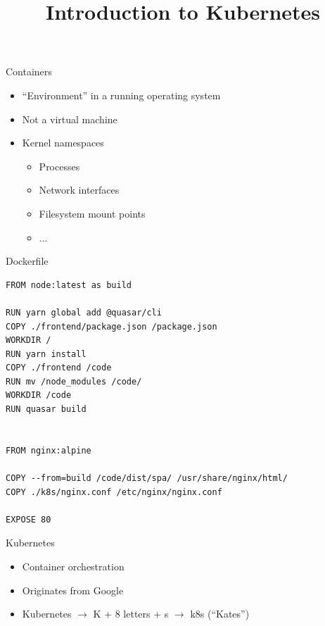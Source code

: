 \documentclass{dcpresentation}
\title{Introduction to Kubernetes}
\author{}
\institute{SciLifeLab Data Centre}
\date{}
\begin{document}
 \begin{frame}
  \maketitle
 \end{frame}

 
 \begin{frame}{Containers}
  \begin{itemize}
   \item ``Environment'' in a running operating system
   \item Not a virtual machine
   \item Kernel namespaces
   \begin{itemize}
    \item Processes
    \item Network interfaces
    \item Filesystem mount points
    \item ...
   \end{itemize}
  \end{itemize}
 \end{frame}
 
 \begin{frame}[fragile]{Dockerfile}
 \scriptsize
  \begin{verbatim}
FROM node:latest as build

RUN yarn global add @quasar/cli
COPY ./frontend/package.json /package.json
WORKDIR /
RUN yarn install
COPY ./frontend /code
RUN mv /node_modules /code/
WORKDIR /code
RUN quasar build


FROM nginx:alpine

COPY --from=build /code/dist/spa/ /usr/share/nginx/html/
COPY ./k8s/nginx.conf /etc/nginx/nginx.conf

EXPOSE 80
  \end{verbatim}
 \end{frame}


 \begin{frame}{Kubernetes}
  \begin{itemize}
   \item Container orchestration
   \item Originates from Google
   \item Kubernetes $\rightarrow$ K + 8 letters + s $\rightarrow$ k8s (``Kates'')
  \end{itemize}
 \end{frame}
 
\end{document}
